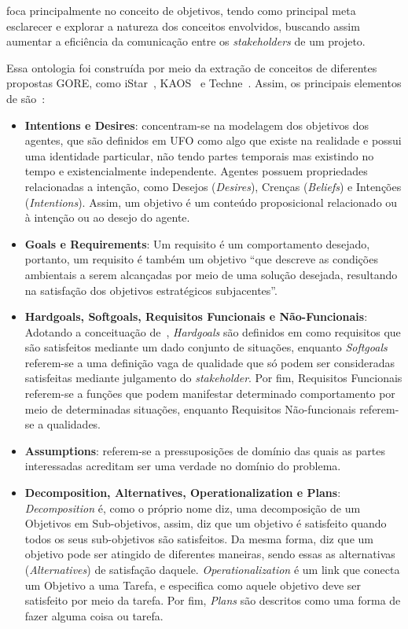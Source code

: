 \goro foca principalmente no conceito de objetivos, tendo como principal meta esclarecer e explorar a natureza dos conceitos envolvidos, buscando assim aumentar a eficiência da comunicação entre os \textit{stakeholders} de um projeto. 

Essa ontologia foi construída por meio da extração de conceitos de diferentes propostas GORE, como iStar~\cite{dalpiaz2016istar}, KAOS~\cite{dardenne1993goal} e Techne~\cite{borgida2009techne}. Assim, os principais elementos de \goro são~\cite{pedrogoro}:

\begin{itemize}
	\item \textbf{Intentions e Desires}: concentram-se na modelagem dos objetivos dos agentes, que são definidos em UFO como algo que existe na realidade e possui uma identidade particular, não tendo partes temporais mas existindo no tempo e existencialmente independente. Agentes possuem propriedades relacionadas a intenção, como Desejos (\textit{Desires}), Crenças (\textit{Beliefs}) e Intenções (\textit{Intentions}). Assim, um objetivo é um conteúdo proposicional relacionado ou à intenção ou ao desejo do agente.
	\item \textbf{Goals e Requirements}: Um requisito é um comportamento desejado, portanto, um requisito é também um objetivo ``que descreve as condições ambientais a serem alcançadas por meio de uma solução desejada, resultando na satisfação dos objetivos estratégicos subjacentes''.
	\item \textbf{Hardgoals, Softgoals, Requisitos Funcionais e Não-Funcionais}: Adotando a conceituação de~\cite{guizzardi2014ontological}, \textit{Hardgoals} são definidos em \goro como requisitos que são satisfeitos mediante um dado conjunto de situações, enquanto \textit{Softgoals} referem-se a uma definição vaga de qualidade que só podem ser consideradas satisfeitas mediante julgamento do \textit{stakeholder}. Por fim, Requisitos Funcionais referem-se a funções que podem manifestar determinado comportamento por meio de determinadas situações, enquanto Requisitos Não-funcionais referem-se a qualidades.
	\item \textbf{Assumptions}: referem-se a pressuposições de domínio das quais as partes interessadas acreditam ser uma verdade no domínio do problema.
	\item \textbf{Decomposition, Alternatives, Operationalization e Plans}: \textit{Decomposition} é, como o próprio nome diz, uma decomposição de um Objetivos em Sub-objetivos, assim, diz que um objetivo é satisfeito quando todos os seus sub-objetivos são satisfeitos. Da mesma forma, diz que um objetivo pode ser atingido de diferentes maneiras, sendo essas as alternativas (\textit{Alternatives}) de satisfação daquele. \textit{Operationalization} é um link que conecta um Objetivo a uma Tarefa, e especifica como aquele objetivo deve ser satisfeito por meio da tarefa. Por fim, \textit{Plans} são descritos como uma forma de fazer alguma coisa ou tarefa.	
\end{itemize}

